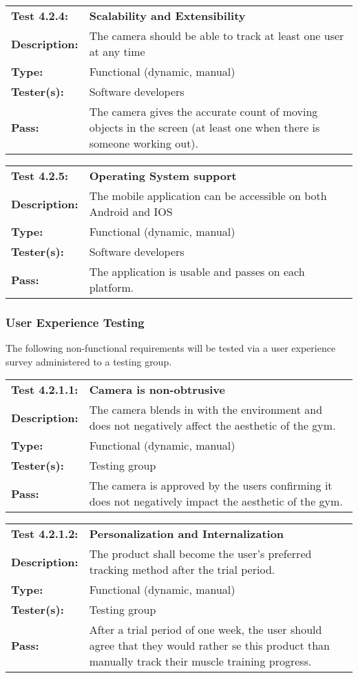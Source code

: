 \documentclass{article}
\newenvironment{testcase}
    {
    \begin{center}
    \begin{mdframed}[
        userdefinedwidth=15.5cm,
        leftmargin=1cm,
        rightmargin=1cm
        ]
    \begin{tabular}{p{2.5cm} p{9cm}}
    }
    {
    \end{tabular}
    \end{mdframed}
    \end{center}
    }
\newcommand{\tctit}[2]{\textbf{#1} & \textbf{#2}}
\newcommand{\tcdesc}{\textbf{Description:}}
\newcommand{\tctype}{\textbf{Type:}}
\newcommand{\testers}{\textbf{Tester(s):}}
\newcommand{\tcpass}{\textbf{Pass:}}
\begin{document}
\begingroup
\begin{testcase}
    \tctit{Test 4.2.4:}{Scalability and Extensibility} \\
    \tcdesc & The camera should be able to track at least one user at any time\\
    \tctype & Functional (dynamic, manual)\\
    \testers & Software developers\\
    \tcpass & The camera gives the accurate count of moving objects in the screen (at least one when there is someone working out).\\
\end{testcase}
\endgroup

\begingroup
\begin{testcase}
    \tctit{Test 4.2.5:}{Operating System support} \\
    \tcdesc & The mobile application can be accessible on both Android and IOS \\
    \tctype & Functional (dynamic, manual)\\
    \testers & Software developers\\
    \tcpass & The application is usable and passes on each platform.\\
\end{testcase}
\endgroup

\newpage
\subsubsection{User Experience Testing}
The following non-functional requirements will be tested via a user experience survey administered to a testing group. 

\begingroup
\begin{testcase}
    \tctit{Test 4.2.1.1:}{Camera is non-obtrusive} \\
    \tcdesc & The camera blends in with the environment and does not negatively affect the aesthetic of the gym. \\
    \tctype & Functional (dynamic, manual)\\
    \testers & Testing group\\
    \tcpass & The camera is approved by the users confirming it does not negatively impact the aesthetic of the gym.\\
\end{testcase}
\endgroup

\begingroup
\begin{testcase}
    \tctit{Test 4.2.1.2:}{Personalization and Internalization} \\
    \tcdesc & The product shall become the user’s preferred tracking method after the trial period.  \\
    \tctype & Functional (dynamic, manual)\\
    \testers & Testing group\\
    \tcpass & After a trial period of one week, the user should agree that they would rather se this product than manually track their muscle training progress.\\
\end{testcase}
\endgroup
\end{document}
